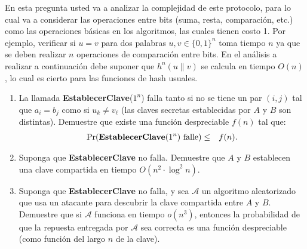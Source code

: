En esta pregunta usted va a analizar la complejidad de este protocolo,
para lo cual va a considerar las operaciones entre bits (suma, resta,
comparación, etc.) como las operaciones básicas en los algoritmos, las
cuales tienen costo 1. Por ejemplo, verificar si $u = v$ para dos
palabras $u, v \in \{0,1\}^n$ toma tiempo $n$ ya que se deben realizar
$n$ operaciones de comparación entre bits. En el análisis a realizar a
continuación debe suponer que $h^n(u \| v)$ se calcula en tiempo
$O(n)$, lo cual es cierto para las funciones de hash usuales.
\begin{enumerate}
\item La llamada {\bf EstablecerClave}($1^n$) falla tanto si no se tiene un par $(i, j)$ tal que $a_i = b_j$ como si $u_k \neq v_\ell$ (las claves secretas establecidas por $A$ y $B$ son distintas). Demuestre que existe una función despreciable $f(n)$ tal que:
\begin{eqnarray*}
\Pr(\text{{\bf EstablecerClave}($1^n$) falle}) & \leq & f(n).
\end{eqnarray*}

\item Suponga que {\bf EstablecerClave} no falla. Demuestre que $A$ y $B$ establecen una clave compartida en tiempo $O(n^2 \cdot \log^2 n)$.

\item Suponga que {\bf EstablecerClave} no falla, y sea $\mathcal{A}$ un algoritmo aleatorizado que usa un atacante para descubrir la clave compartida entre $A$ y $B$. Demuestre que si $\mathcal{A}$ funciona en tiempo $o(n^3)$, entonces la probabilidad de que la repuesta entregada por $\mathcal{A}$ sea correcta es una función despreciable (como función del largo $n$ de la clave).
\end{enumerate}




